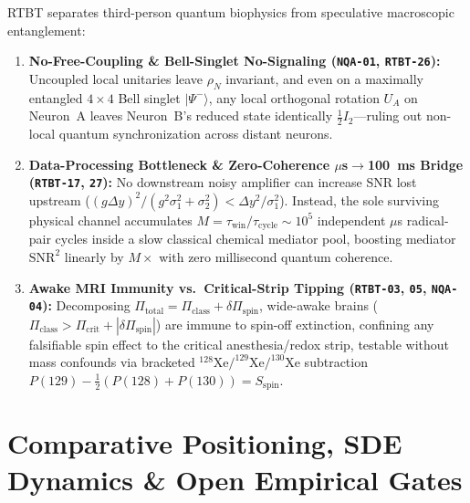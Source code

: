 \documentclass[11pt,letterpaper]{article}
\newcommand{\code}[1]{\texttt{\small #1}}
\begin{document}
RTBT separates third-person quantum biophysics from speculative macroscopic entanglement:
\begin{enumerate}
  \item \textbf{No-Free-Coupling \& Bell-Singlet No-Signaling (\code{NQA-01}, \code{RTBT-26}):} Uncoupled local unitaries leave $\rho_N$ invariant, and even on a maximally entangled $4\times 4$ Bell singlet $|\Psi^-\rangle$, any local orthogonal rotation $U_A$ on Neuron~A leaves Neuron~B's reduced state identically $\frac{1}{2}I_2$—ruling out non-local quantum synchronization across distant neurons.
  \item \textbf{Data-Processing Bottleneck \& Zero-Coherence $\mu$s$\to$100~ms Bridge (\code{RTBT-17}, \code{27}):} No downstream noisy amplifier can increase SNR lost upstream ($(g\Delta y)^2/(g^2\sigma_1^2+\sigma_2^2) < \Delta y^2/\sigma_1^2$). Instead, the sole surviving physical channel accumulates $M = \tau_{\mathrm{win}}/\tau_{\mathrm{cycle}} \sim 10^5$ independent $\mu$s radical-pair cycles inside a slow classical chemical mediator pool, boosting mediator $\mathrm{SNR}^2$ linearly by $M\times$ with zero millisecond quantum coherence.
  \item \textbf{Awake MRI Immunity vs.\ Critical-Strip Tipping (\code{RTBT-03}, \code{05}, \code{NQA-04}):} Decomposing $\Pi_{\mathrm{total}} = \Pi_{\mathrm{class}} + \delta\Pi_{\mathrm{spin}}$, wide-awake brains ($\Pi_{\mathrm{class}} > \Pi_{\mathrm{crit}} + |\delta\Pi_{\mathrm{spin}}|$) are immune to spin-off extinction, confining any falsifiable spin effect to the critical anesthesia/redox strip, testable without mass confounds via bracketed $^{128}\mathrm{Xe}/^{129}\mathrm{Xe}/^{130}\mathrm{Xe}$ subtraction $P(129) - \frac{1}{2}(P(128)+P(130)) = S_{\mathrm{spin}}$.
\end{enumerate}

\section{Comparative Positioning, SDE Dynamics \& Open Empirical Gates}
\end{document}
